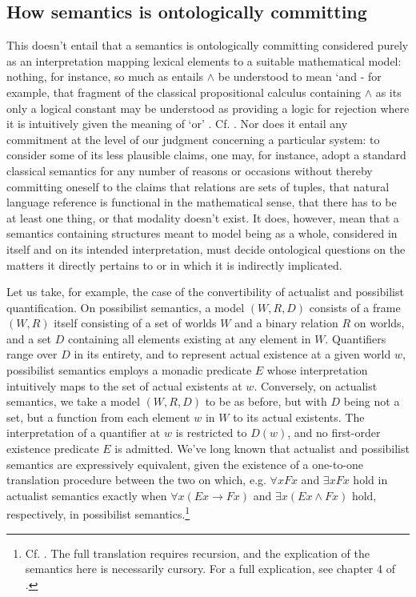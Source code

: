 \documentclass[]{article}
\begin{document}
\subsection{How semantics is ontologically committing}
This doesn't entail that a semantics is ontologically committing considered purely as an interpretation mapping lexical elements to a suitable mathematical model: 
nothing, for instance, so much as entails $\wedge$ be understood to mean `and - 
for example, that fragment of the classical propositional calculus containing $\wedge$ as its only a logical constant may be understood as providing a logic for rejection where it is intuitively given the meaning of `or' . Cf. \autocite[222]{Kripke2015}.
Nor does it entail any commitment at the level of our judgment concerning a particular system: 
to consider some of its less plausible claims, 
one may, for instance, adopt a standard classical semantics for any number of reasons or occasions without thereby committing oneself to the claims 
that relations are sets of tuples, 
that natural language reference is functional in the mathematical sense, 
that there has to be at least one thing, 
or that modality doesn't exist.
It does, however, mean
that a semantics containing structures meant to model being as a whole, 
considered in itself and on its intended interpretation, 
must decide ontological questions on the matters it directly pertains to or in which it is indirectly implicated. 

Let us take, for example, the case of the convertibility of actualist and possibilist quantification. 
On possibilist semantics, a model $(W, R, D)$ consists of a frame $(W, R)$ 
itself consisting of a set of worlds $W$ and a binary relation $R$ on worlds, 
and a set $D$ containing all elements existing at any element in $W$. 
Quantifiers range over $D$ in its entirety, and to represent actual existence at a given world $w$, possibilist semantics employs a monadic predicate $E$ 
whose interpretation intuitively maps to the set of actual existents at $w$. 
Conversely, on actualist semantics, 
we take a model $(W, R, D)$ to be as before, 
but with $D$ being not a set, but a function from each element $w$ in $W$ to its actual existents. 
The interpretation of a quantifier at $w$ is restricted to $D(w)$, 
and no first-order existence predicate $E$ is admitted.
We've long known that actualist and possibilist semantics are expressively equivalent, 
given the existence of a one-to-one translation procedure between the two on which, e.g. 
$\forall x Fx $ and $\exists x Fx$ hold in actualist semantics 
exactly when $\forall x (Ex \rightarrow Fx)$ and $\exists x(Ex \wedge Fx)$ hold, respectively, in possibilist semantics.\footnote{
	Cf. \autocite{Lejewski1954}. 
	The full translation requires recursion, 
	and the explication of the semantics here is necessarily cursory. 
	For a full explication, see chapter 4 of \autocite{Fitting1998}.}
\end{document}
